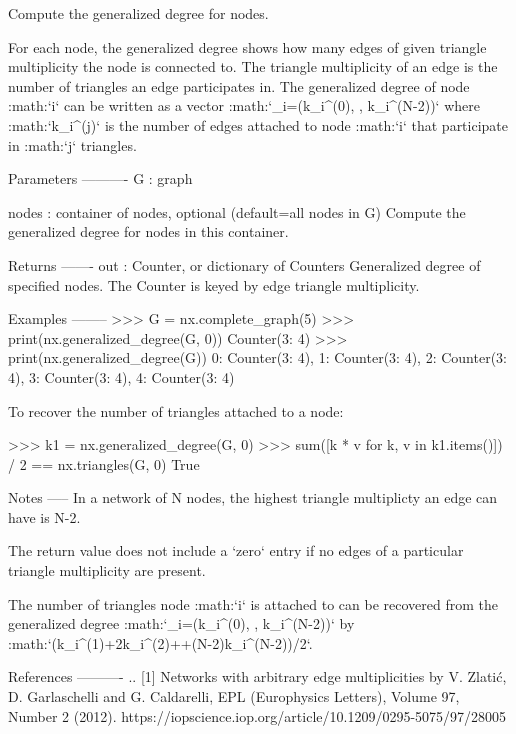 \begin{DoxyVerb}Compute the generalized degree for nodes.

For each node, the generalized degree shows how many edges of given
triangle multiplicity the node is connected to. The triangle multiplicity
of an edge is the number of triangles an edge participates in. The
generalized degree of node :math:`i` can be written as a vector
:math:`_i=(k_i^{(0)}, \dotsc, k_i^{(N-2)})` where
:math:`k_i^{(j)}` is the number of edges attached to node :math:`i` that
participate in :math:`j` triangles.

Parameters
----------
G : graph

nodes : container of nodes, optional (default=all nodes in G)
   Compute the generalized degree for nodes in this container.

Returns
-------
out : Counter, or dictionary of Counters
   Generalized degree of specified nodes. The Counter is keyed by edge
   triangle multiplicity.

Examples
--------
>>> G = nx.complete_graph(5)
>>> print(nx.generalized_degree(G, 0))
Counter({3: 4})
>>> print(nx.generalized_degree(G))
{0: Counter({3: 4}), 1: Counter({3: 4}), 2: Counter({3: 4}), 3: Counter({3: 4}), 4: Counter({3: 4})}

To recover the number of triangles attached to a node:

>>> k1 = nx.generalized_degree(G, 0)
>>> sum([k * v for k, v in k1.items()]) / 2 == nx.triangles(G, 0)
True

Notes
-----
In a network of N nodes, the highest triangle multiplicty an edge can have
is N-2.

The return value does not include a `zero` entry if no edges of a
particular triangle multiplicity are present.

The number of triangles node :math:`i` is attached to can be recovered from
the generalized degree :math:`_i=(k_i^{(0)}, \dotsc,
k_i^{(N-2)})` by :math:`(k_i^{(1)}+2k_i^{(2)}+\dotsc +(N-2)k_i^{(N-2)})/2`.

References
----------
.. [1] Networks with arbitrary edge multiplicities by V. Zlatić,
    D. Garlaschelli and G. Caldarelli, EPL (Europhysics Letters),
    Volume 97, Number 2 (2012).
    https://iopscience.iop.org/article/10.1209/0295-5075/97/28005
\end{DoxyVerb}
 \mbox{\label{namespacenetworkx_1_1algorithms_1_1cluster_a5f995bd21e2f8307be5d151c494ac4b8}} 
